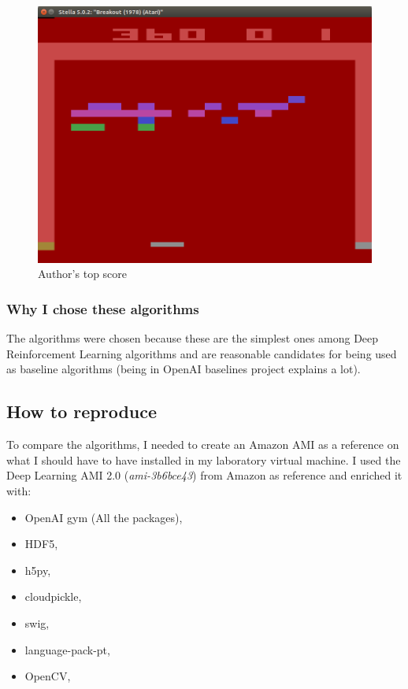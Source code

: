 \documentclass[11pt,twoside,a4paper]{article}
\begin{document}
\begin{figure}[H]
  \includegraphics[scale=0.25]{images/top-score.png}
  \centering
  \caption{Author's top score}
  \label{fig:top-score}
\end{figure}

\subsubsection*{Why I chose these algorithms}

The algorithms were chosen because these are the simplest ones among Deep
Reinforcement Learning algorithms and are reasonable candidates for being used
as baseline algorithms (being in OpenAI baselines project explains a lot).

\subsection*{How to reproduce}

To compare the algorithms, I needed to create an Amazon AMI as a reference on
what I should have to have installed in my laboratory virtual machine. I used
the Deep Learning AMI 2.0 (\emph{ami-3b6bce43}) from Amazon as reference and
enriched it with:

\begin{itemize}
  \item OpenAI gym (All the packages),
  \item HDF5,
  \item h5py,
  \item cloudpickle,
  \item swig,
  \item language-pack-pt,
  \item OpenCV,
\end{itemize}
\end{document}

